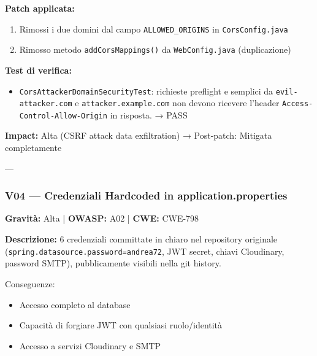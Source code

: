 \documentclass[12pt, a4paper]{article}
\begin{document}
    \textbf{Patch applicata:}
    \begin{enumerate}
        \item Rimossi i due domini dal campo \texttt{ALLOWED\_ORIGINS} in \texttt{CorsConfig.java}
        \item Rimosso metodo \texttt{addCorsMappings()} da \texttt{WebConfig.java} (duplicazione)
    \end{enumerate}

    \textbf{Test di verifica:}
    \begin{itemize}
        \item \texttt{CorsAttackerDomainSecurityTest}: richieste preflight e semplici da
        \texttt{evil-attacker.com} e \texttt{attacker.example.com} non devono ricevere
        l'header \texttt{Access-Control-Allow-Origin} in risposta. → \checkmark{} PASS
    \end{itemize}

    \textbf{Impact:} Alta (CSRF attack data exfiltration) → Post-patch: Mitigata completamente

    ---

    \subsubsection{V04 — Credenziali Hardcoded in application.properties}

    \textbf{Gravità:} Alta | \textbf{OWASP:} A02 | \textbf{CWE:} CWE-798

    \textbf{Descrizione:} 6 credenziali committate in chiaro nel repository originale
    (\texttt{spring.datasource.password=andrea72}, JWT secret, chiavi Cloudinary,
    password SMTP), pubblicamente visibili nella git history.

    Conseguenze:
    \begin{itemize}
        \item Accesso completo al database
        \item Capacità di forgiare JWT con qualsiasi ruolo/identità
        \item Accesso a servizi Cloudinary e SMTP
    \end{itemize}
\end{document}
